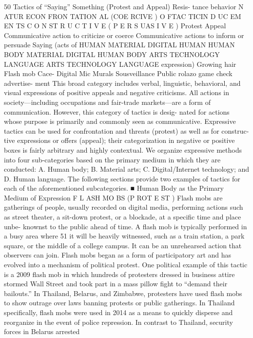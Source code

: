 \documentclass[twoside,a4paper,12pt,fleqn,openany]{extbook}
\begin{document}
50
Tactics of “Saying” Something (Protest and Appeal)
Resis-
tance
behavior
N ATUR ECON FRON TATION AL
(COE RCIVE )
O FTAC TICIN D UC EM EN TS
C O N ST R U C T I V E
( P E R S UAS I V E )
Protest
 Appeal
Communicative action to criticize or coerce
 Communicative actions to inform or persuade
Saying
(acts of
 HUMAN
 MATERIAL
 DIGITAL
 HUMAN
 HUMAN BODY
 MATERIAL
 DIGITAL
 HUMAN
BODY
 ARTS
 TECHNOLOGY
 LANGUAGE
 ARTS
 TECHNOLOGY
 LANGUAGE
expression)
 Growing hair
Flash mob
 Cace-
 Digital
 Mic
 Murals
 Sousveillance
 Public
rolazo
 game
 check
 advertise-
ment
This broad category includes verbal, linguistic, behavioral, and visual expressions of
positive appeals and negative criticisms. All actions in society—including occupations and
fair-trade markets—are a form of communication. However, this category of tactics is desig-
nated for actions whose purpose is primarily and commonly seen as communicative.
Expressive tactics can be used for confrontation and threats (protest) as well as for construc-
tive expressions or offers (appeal); their categorization in negative or positive boxes is fairly
arbitrary and highly contextual.
We organize expressive methods into four sub-categories based on the primary medium
in which they are conducted:
A.	 Human body;
B.	 Material arts;
C.	 Digital/Internet technology; and
D.	 Human language.
The following sections provide two examples of tactics for each of the aforementioned
subcategories.
■ Human Body as the Primary Medium of Expression
F L ASH MO BS (P ROT E ST )
Flash mobs are gatherings of people, usually recorded on digital media, performing actions
such as street theater, a sit-down protest, or a blockade, at a specific time and place unbe-
knownst to the public ahead of time. A flash mob is typically performed in a busy area where
51
it will be heavily witnessed, such as a train station, a park square, or the middle of a college
campus. It can be an unrehearsed action that observers can join.
Flash mobs began as a form of participatory art and has evolved into a mechanism of
political protest. One political example of this tactic is a 2009 flash mob in which hundreds
of protesters dressed in business attire stormed Wall Street and took part in a mass pillow
fight to “demand their bailouts.” In Thailand, Belarus, and Zimbabwe, protesters have used
flash mobs to show outrage over laws banning protests or public gatherings. In Thailand
specifically, flash mobs were used in 2014 as a means to quickly disperse and reorganize in
the event of police repression. In contrast to Thailand, security forces in Belarus arrested
\end{document}
